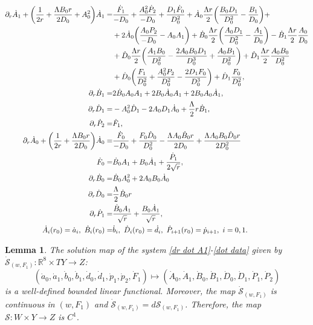 \documentclass[11pt]{article}
\newtheorem{lemma}{Lemma}[section]
\numberwithin{equation}{section}
\begin{document}
\begin{align}
    \partial_r\dot{A}_1+\bigg(\frac{1}{2r}+\frac{\Lambda B_0 r}{2D_0}+A_0^2\bigg)\dot{A}_1=&\frac{\dot{F}_1}{-D_0}+\frac{A_0^2\dot{P}_2}{-D_0}+\frac{D_1\dot{F}_0}{D_0^2}+\dot{A}_0\frac{\Lambda r}{2}\bigg(\frac{B_0D_1}{D_0^2}-\frac{B_1}{D_0}\bigg)+\label{dr dot A1}\\&+2\dot{A}_0\bigg(\frac{A_0P_2}{-D_0}-A_0A_1\bigg)+\dot{B}_0\frac{\Lambda r}{2}\bigg(\frac{A_0D_1}{D_0^2}-\frac{A_1}{D_0}\bigg)-\dot{B}_1\frac{\Lambda r}{2}\frac{A_0}{D_0}\notag\\&+\dot{D}_0\frac{\Lambda r}{2}\bigg(\frac{A_1 B_0}{D_0^2}-\frac{2A_0B_0D_1}{D_0^3}+\frac{A_0B_1}{D_0^2}\bigg)+\dot{D}_1\frac{\Lambda r}{2}\frac{A_0B_0}{D_0^2}\notag\\
    &+\dot{D}_0\bigg(\frac{F_1}{D_0^2}+\frac{A_0^2P_2}{D_0^2}-\frac{2D_1F_0}{D_0^3}\bigg)+\dot{D}_1\frac{F_0}{D_0^2},\notag\\
    \partial_r\dot{B}_1=&2\dot{B}_0 A_0 A_1+2B_0\dot{A}_0 A_1+2B_0 A_0\dot{A}_1,\label{dr dot B1}\\
    \partial_r\dot{D}_1=& -A_0^2\dot{D}_1-2A_0D_1\dot{A}_0+\frac{\Lambda}{2}r\dot{B}_1,\label{dr dot D1}\\
    \partial_r\dot{P}_2=&\dot{F}_1,\label{dr dot P2}\\
    \partial_r\dot{A}_0+\bigg(\frac{1}{2r}+\frac{\Lambda B_0 r}{2D_0}\bigg)\dot{A}_0=&\frac{\dot{F}_0}{-D_0}+\frac{F_0\dot{D}_0}{D_0^2}-\frac{\Lambda A_0 \dot{B}_0 r}{2D_0}+\frac{\Lambda A_0 B_0 \dot{D}_0 r}{2D_0^2}\label{dr dot A0}\\
    \dot{F}_0=&\dot{B}_0A_1+B_0\dot{A}_1+\frac{\dot{P}_1}{2\sqrt{r}},\label{dot F0}\\
    \partial_r\dot{B}_0=&\dot{B}_0A_0^2+2A_0B_0\dot{A}_0\label{dr dot B0}\\
    \partial_r\dot{D}_0=&\frac{\Lambda}{2}\dot{B}_0 r\label{dr dot D0}\\
    \partial_r\dot{P}_1=&\frac{\dot{B}_0A_1}{\sqrt{r}}+\frac{B_0\dot{A}_1}{\sqrt{r}},\label{dr dot P1}\\
    \dot{A}_i(r_0)=\dot{a}_i,\ \dot{B}_i(r_0)=&\dot{b}_i,\ \dot{D}_i(r_0)=\dot{d}_i,\ \dot{P}_{i+1}(r_0)=\dot{p}_{i+1},\ i=0,1.\label{dot data}
\end{align}
\begin{lemma}\label{dot S is well defined lemma}
    The solution map of the system \eqref{dr dot A1}-\eqref{dot data} given by $\dot{\mathcal{S}}_{(w,F_1)}:\mathbb{R}^8\times TY\rightarrow Z$:
    \[(\dot{a}_0,\dot{a}_1,\dot{b}_0,\dot{b}_1,\dot{d}_0,\dot{d}_1,\dot{p}_1,\dot{p}_2,\dot{F}_1)\mapsto(\dot{A}_0,\dot{A}_1,\dot{B}_0,\dot{B}_1,\dot{D}_0,\dot{D}_1,\dot{P}_1,\dot{P}_2)\] 
    is a well-defined bounded linear functional. Moreover, the map $\dot{\mathcal{S}}_{(w,F_1)}$ is continuous in $(w,F_1)$ and $\dot{\mathcal{S}}_{(w,F_1)}=d\mathcal{S}_{(w,F_1)}$. Therefore, the map $\mathcal{S}:W\times Y\rightarrow Z$ is $C^1.$
\end{lemma}
\end{document}
